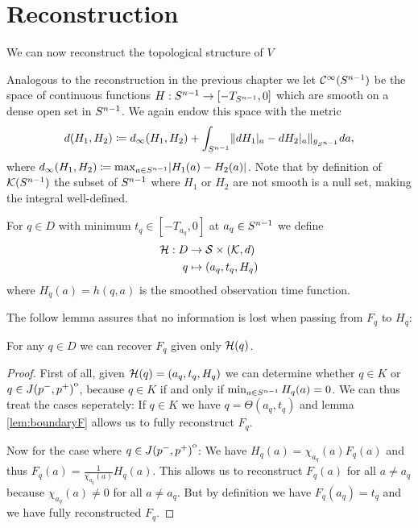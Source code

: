 \section{Reconstruction}
We can now reconstruct the topological structure of $V$

Analogous to the reconstruction in the previous chapter we let ${\mathcal{C}}^{\infty}({S^{n-1}})$ be the space of continuous functions $H:{S^{n-1}} \to [-T_{S^{n-1}},0]$ which are smooth on a dense open set in ${S^{n-1}}$. We again endow this space with the metric 
\[
    d(H_1,H_2)\coloneqq  d_\infty(H_1,H_2) + \int_{{S^{n-1}}} \lVert dH_1\rvert_a - dH_2\rvert_a \rVert_{g_{S^{n-1}}}da,
\] where $d_\infty(H_1,H_2)\coloneqq \max_{a\in {S^{n-1}}}\lvert H_1(a)-H_2(a)\rvert$.
Note that by definition of ${\mathcal{K}}({S^{n-1}})$ the subset of ${S^{n-1}}$ where $H_1$ or $H_2$ are not smooth is a null set, making the integral well-defined.

For $q\in D$ with minimum $t_q\in [-T_{a_q},0]$ at $a_q\in {S^{n-1}}$ we define
\begin{align*}
    \mathcal{H}:D &\to {\mathcal{S}}\times({\mathcal{K}}, d)\\
    q&\mapsto (a_q,t_q, H_q)
\end{align*} where $H_q(a)=h(q,a)$ is the smoothed observation time function.

The follow lemma assures that no information is lost when passing from $F_q$ to $H_q$:
\begin{lemma}
    For any $q\in D$ we can recover $F_q$ given only ${\mathcal{H}}(q)$.
\end{lemma}
\begin{proof}
    First of all, given ${\mathcal{H}}(q)=(a_q,t_q, H_q)$ we can determine whether $q\in K$ or $q\in {\kern0ptJ(p^-,p^+)}^{\mathrm{o}}$, because $q\in K$ if and only if $\min_{a\in {S^{n-1}}} H_q(a)=0$. We can thus treat the cases seperately: If $q\in K$ we have $q=\Theta(a_q,t_q)$ and lemma \ref{lem:boundaryF} allows us to fully reconstruct $F_q$.

    Now for the case where $q\in {\kern0ptJ(p^-,p^+)}^{\mathrm{o}}$: We have $H_q(a)=\chi_{a_q}(a)F_q(a)$ and thus $F_q(a) = \frac{1}{\chi_{a_q}(a)}H_q(a)$. This allows us to reconstruct $F_q(a)$ for all $a\neq a_q$ because $\chi_{a_q}(a)\neq 0$ for all $a\neq a_q$. But by definition we have $F_q(a_q)=t_q$ and we have fully  reconstructed $F_q$.
\end{proof}

